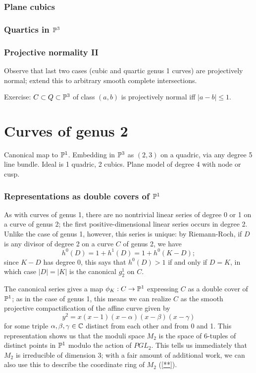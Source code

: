 \subsubsection{Plane cubics}

\subsubsection{Quartics in $\PP^3$}

\subsubsection{Projective normality II}

Observe that last two cases (cubic and quartic genus 1 curves) are projectively normal; extend this to arbitrary smooth complete intersections.

Exercise: $C \subset Q \subset \PP^3$ of class $(a,b)$ is projectively normal iff $|a-b| \leq 1$.

\section{Curves of genus 2}

Canonical map to $\PP^1$. Embedding in $\PP^3$ as $(2,3)$ on a quadric, via any degree 5 line bundle. Ideal is 1 quadric, 2 cubics.
Plane model of degree 4 with node or cusp.

\subsubsection{Representations as double covers of $\PP^1$}

As with curves of genus 1, there are no nontrivial linear series of degree 0 or 1 on a curve of genus 2; the first positive-dimensional linear series occurs in degree 2. Unlike the case of genus 1, however, this series is unique: by Riemann-Roch, if $D$ is any divisor of degree 2 on a curve $C$ of genus 2, we have
$$
h^0(D) = 1 + h^1(D) = 1 + h^0(K-D);
$$
since $K-D$ has degree 0, this says that $h^0(D) > 1$ if and only if $D=K$, in which case $|D| = |K|$ is the canonical $g^1_2$ on $C$.

The canonical series gives a map $\phi_K : C \to \PP^1$ expressing $C$ as a double cover of $\PP^1$; as in the case of genus 1, this means we can realize $C$ as the smooth projective compactification of the affine curve given by
$$
y^2 = x(x-1)(x - \alpha)(x - \beta)(x - \gamma)
$$
for some triple $\alpha,\beta,\gamma \in \CC$ distinct from each other and from 0 and 1. This representation shows us that the moduli space $M_2$ is the space of 6-tuples of distinct points in $\PP^1$ modulo the action of $PGL_2$. This tells us immediately that $M_2$ is irreducible of dimension 3; with a fair amount of additional work, we can also use this to describe the coordinate ring of $M_2$ (\ref{**}).

